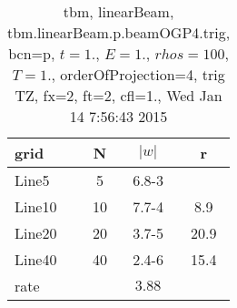 \begin{table}[hbt]\tableFont %
\begin{center}
\begin{tabular}{|l|c|c|c|} \hline 
grid  & N &  $\vert w \vert$   & r \\ \hline 
               Line5 &     5 & \num{6.8}{-3} &       \\ \hline
              Line10 &    10 & \num{7.7}{-4} &  8.9  \\ \hline
              Line20 &    20 & \num{3.7}{-5} & 20.9  \\ \hline
              Line40 &    40 & \num{2.4}{-6} & 15.4  \\ \hline
    rate             &       &  $3.88$       &       \\ \hline
\end{tabular}
\caption{tbm, linearBeam, tbm.linearBeam.p.beamOGP4.trig, bcn=p, $ t=1.$, $ E=1.$, $ rhos=100$, $ T=1.$,  orderOfProjection=4, trig TZ, fx=2, ft=2, cfl=1., Wed Jan 14  7:56:43 2015}\label{table:tbm.linearBeam.p.beamOGP4.trig}
\end{center}
\end{table}
